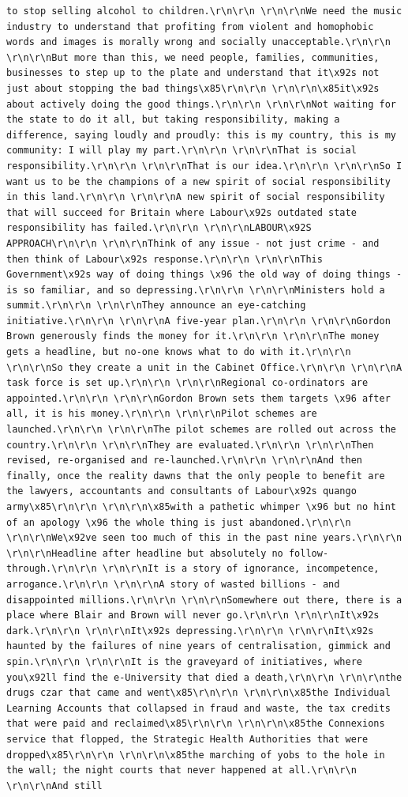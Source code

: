 \documentclass[
  letterpaper,
  DIV=11,
  numbers=noendperiod]{scrreprt}
\begin{document}
\begin{verbatim}
to stop selling alcohol to children.\r\n\r\n \r\n\r\nWe need the music industry to understand that profiting from violent and homophobic words and images is morally wrong and socially unacceptable.\r\n\r\n \r\n\r\nBut more than this, we need people, families, communities, businesses to step up to the plate and understand that it\x92s not just about stopping the bad things\x85\r\n\r\n \r\n\r\n\x85it\x92s about actively doing the good things.\r\n\r\n \r\n\r\nNot waiting for the state to do it all, but taking responsibility, making a difference, saying loudly and proudly: this is my country, this is my community: I will play my part.\r\n\r\n \r\n\r\nThat is social responsibility.\r\n\r\n \r\n\r\nThat is our idea.\r\n\r\n \r\n\r\nSo I want us to be the champions of a new spirit of social responsibility in this land.\r\n\r\n \r\n\r\nA new spirit of social responsibility that will succeed for Britain where Labour\x92s outdated state responsibility has failed.\r\n\r\n \r\n\r\nLABOUR\x92S APPROACH\r\n\r\n \r\n\r\nThink of any issue - not just crime - and then think of Labour\x92s response.\r\n\r\n \r\n\r\nThis Government\x92s way of doing things \x96 the old way of doing things - is so familiar, and so depressing.\r\n\r\n \r\n\r\nMinisters hold a summit.\r\n\r\n \r\n\r\nThey announce an eye-catching initiative.\r\n\r\n \r\n\r\nA five-year plan.\r\n\r\n \r\n\r\nGordon Brown generously finds the money for it.\r\n\r\n \r\n\r\nThe money gets a headline, but no-one knows what to do with it.\r\n\r\n \r\n\r\nSo they create a unit in the Cabinet Office.\r\n\r\n \r\n\r\nA task force is set up.\r\n\r\n \r\n\r\nRegional co-ordinators are appointed.\r\n\r\n \r\n\r\nGordon Brown sets them targets \x96 after all, it is his money.\r\n\r\n \r\n\r\nPilot schemes are launched.\r\n\r\n \r\n\r\nThe pilot schemes are rolled out across the country.\r\n\r\n \r\n\r\nThey are evaluated.\r\n\r\n \r\n\r\nThen revised, re-organised and re-launched.\r\n\r\n \r\n\r\nAnd then finally, once the reality dawns that the only people to benefit are the lawyers, accountants and consultants of Labour\x92s quango army\x85\r\n\r\n \r\n\r\n\x85with a pathetic whimper \x96 but no hint of an apology \x96 the whole thing is just abandoned.\r\n\r\n \r\n\r\nWe\x92ve seen too much of this in the past nine years.\r\n\r\n \r\n\r\nHeadline after headline but absolutely no follow-through.\r\n\r\n \r\n\r\nIt is a story of ignorance, incompetence, arrogance.\r\n\r\n \r\n\r\nA story of wasted billions - and disappointed millions.\r\n\r\n \r\n\r\nSomewhere out there, there is a place where Blair and Brown will never go.\r\n\r\n \r\n\r\nIt\x92s dark.\r\n\r\n \r\n\r\nIt\x92s depressing.\r\n\r\n \r\n\r\nIt\x92s haunted by the failures of nine years of centralisation, gimmick and spin.\r\n\r\n \r\n\r\nIt is the graveyard of initiatives, where you\x92ll find the e-University that died a death,\r\n\r\n \r\n\r\nthe drugs czar that came and went\x85\r\n\r\n \r\n\r\n\x85the Individual Learning Accounts that collapsed in fraud and waste, the tax credits that were paid and reclaimed\x85\r\n\r\n \r\n\r\n\x85the Connexions service that flopped, the Strategic Health Authorities that were dropped\x85\r\n\r\n \r\n\r\n\x85the marching of yobs to the hole in the wall; the night courts that never happened at all.\r\n\r\n \r\n\r\nAnd still 
\end{verbatim}
\end{document}
